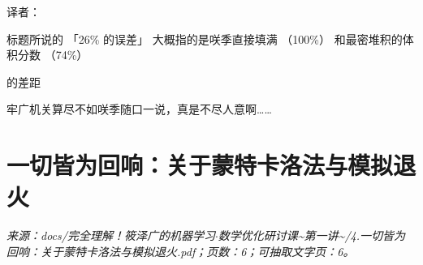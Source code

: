 译者：\par
标题所说的 「26\% 的误差」 大概指的是咲季直接填满 （100\%） 和最密堆积的体积分数 （74\%）\par
的差距\par
牢广机关算尽不如咲季随口一说，真是不尽人意啊……\par
\endgroup
\clearpage
\section*{一切皆为回响：关于蒙特卡洛法与模拟退火}
\begingroup\small
\noindent\textit{来源：docs/完全理解！筱泽广的机器学习$\cdot$数学优化研讨课\textasciitilde{}第一讲\textasciitilde{}/4.一切皆为回响：关于蒙特卡洛法与模拟退火.pdf；页数：6；可抽取文字页：6。}\par
\endgroup
\medskip
\begingroup
\setlength{\parindent}{0pt}
\setlength{\parskip}{0.45em}

